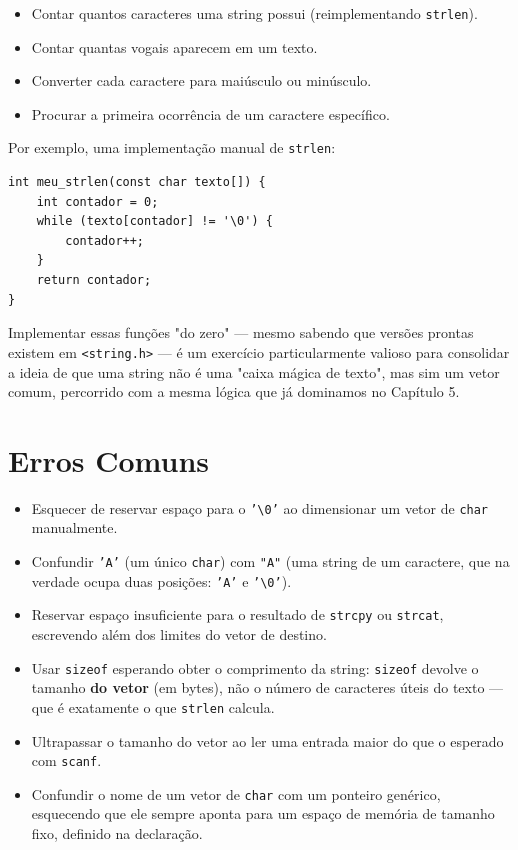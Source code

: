 \begin{itemize}
    \item Contar quantos caracteres uma string possui (reimplementando \texttt{strlen}).
    \item Contar quantas vogais aparecem em um texto.
    \item Converter cada caractere para maiúsculo ou minúsculo.
    \item Procurar a primeira ocorrência de um caractere específico.
\end{itemize}

Por exemplo, uma implementação manual de \texttt{strlen}:

\begin{lstlisting}
int meu_strlen(const char texto[]) {
    int contador = 0;
    while (texto[contador] != '\0') {
        contador++;
    }
    return contador;
}
\end{lstlisting}

Implementar essas funções "do zero" — mesmo sabendo que versões prontas existem em \texttt{<string.h>} — é um exercício particularmente valioso para consolidar a ideia de que uma string não é uma "caixa mágica de texto", mas sim um vetor comum, percorrido com a mesma lógica que já dominamos no Capítulo 5.

\section{Erros Comuns}
\label{sec:strings-erros}

\begin{itemize}
    \item Esquecer de reservar espaço para o \texttt{'\textbackslash 0'} ao dimensionar um vetor de \texttt{char} manualmente.
    \item Confundir \texttt{'A'} (um único \texttt{char}) com \texttt{"A"} (uma string de um caractere, que na verdade ocupa duas posições: \texttt{'A'} e \texttt{'\textbackslash 0'}).
    \item Reservar espaço insuficiente para o resultado de \texttt{strcpy} ou \texttt{strcat}, escrevendo além dos limites do vetor de destino.
    \item Usar \texttt{sizeof} esperando obter o comprimento da string: \texttt{sizeof} devolve o tamanho \textbf{do vetor} (em bytes), não o número de caracteres úteis do texto — que é exatamente o que \texttt{strlen} calcula.
    \item Ultrapassar o tamanho do vetor ao ler uma entrada maior do que o esperado com \texttt{scanf}.
    \item Confundir o nome de um vetor de \texttt{char} com um ponteiro genérico, esquecendo que ele sempre aponta para um espaço de memória de tamanho fixo, definido na declaração.
\end{itemize}

